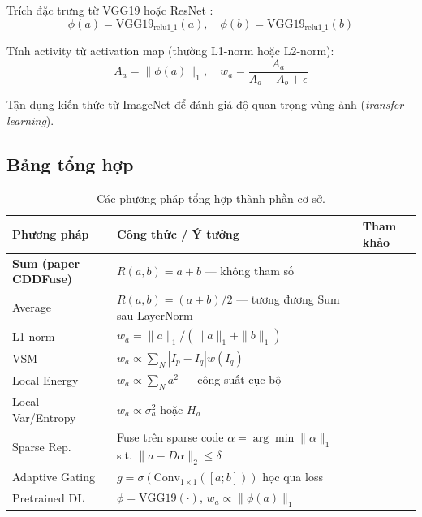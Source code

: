\documentclass[12pt,a4paper]{article}
\begin{document}
Trích đặc trưng từ VGG19 \cite{liu2017vggfuse} hoặc ResNet \cite{li2018resnetfuse}:
\begin{equation}
\phi(a) = \mathrm{VGG19}_{\text{relu1\_1}}(a), \quad \phi(b) = \mathrm{VGG19}_{\text{relu1\_1}}(b)
\end{equation}

Tính activity từ activation map (thường L1-norm hoặc L2-norm):
\begin{equation}
A_a = \|\phi(a)\|_1, \quad w_a = \frac{A_a}{A_a + A_b + \epsilon}
\end{equation}

Tận dụng kiến thức từ ImageNet để đánh giá độ quan trọng vùng ảnh (\emph{transfer learning}).

\subsection{Bảng tổng hợp}

\begin{table}[h]
\centering
\small
\caption{Các phương pháp tổng hợp thành phần cơ sở.}
\label{tab:base-methods}
\begin{tabular}{l p{7.5cm} l}
\toprule
\textbf{Phương pháp} & \textbf{Công thức / Ý tưởng} & \textbf{Tham khảo} \\
\midrule
\textbf{Sum (paper CDDFuse)} & $R(a,b) = a + b$ --- không tham số & \cite{burt1983laplacian, zhao2023cddfuse} \\
Average & $R(a,b) = (a+b)/2$ --- tương đương Sum sau LayerNorm & \cite{burt1983laplacian} \\
L1-norm    & $w_a = \|a\|_1 / (\|a\|_1 + \|b\|_1)$ & \cite{li2018densefuse} \\
VSM        & $w_a \propto \sum_{N} |I_p - I_q| w(I_q)$ & \cite{wang2008vsm,li2013guided} \\
Local Energy & $w_a \propto \sum_N a^2$ --- công suất cục bộ & \cite{liu2017survey} \\
Local Var/Entropy & $w_a \propto \sigma^2_a$ hoặc $H_a$ & \cite{liu2017survey} \\
Sparse Rep. & Fuse trên sparse code $\alpha = \arg\min \|\alpha\|_1$ s.t. $\|a - D\alpha\|_2 \le \delta$ & \cite{yang2010spfusion} \\
Adaptive Gating & $g = \sigma(\mathrm{Conv}_{1\times 1}([a;b]))$ học qua loss & \cite{prabhakar2017deepfuse} \\
Pretrained DL & $\phi = \mathrm{VGG19}(\cdot)$, $w_a \propto \|\phi(a)\|_1$ & \cite{liu2017vggfuse,li2018resnetfuse} \\
\bottomrule
\end{tabular}
\end{table}
\end{document}
